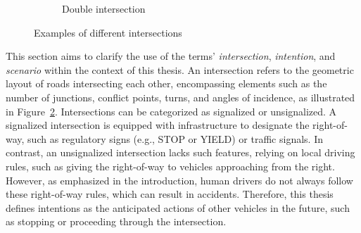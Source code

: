 \begin{figure}[h]
\begin{subfigure}[t]{0.48\columnwidth}
		\label{fig:double_intersection}
		\caption{Double intersection}
	\end{subfigure}

	\caption{Examples of different intersections}
	\label{fig:example_intersections}
\end{figure}
This section aims to clarify the use of the terms' \textit{intersection}, \textit{intention}, and \textit{scenario} within the context of this thesis.
An intersection refers to the geometric layout of roads intersecting each other, encompassing elements such as the number of junctions, conflict points, turns, and angles of incidence, as illustrated in Figure~\ref{fig:example_intersections}. 
Intersections can be categorized as signalized or unsignalized. A signalized intersection is equipped with infrastructure to designate the right-of-way, such as regulatory signs (e.g., STOP or YIELD) or traffic signals. In contrast, an unsignalized intersection lacks such features, relying on local driving rules, such as giving the right-of-way to vehicles approaching from the right. However, as emphasized in the introduction, human drivers do not always follow these right-of-way rules, which can result in accidents. Therefore, this thesis defines intentions as the anticipated actions of other vehicles in the future, such as stopping or proceeding through the intersection.

